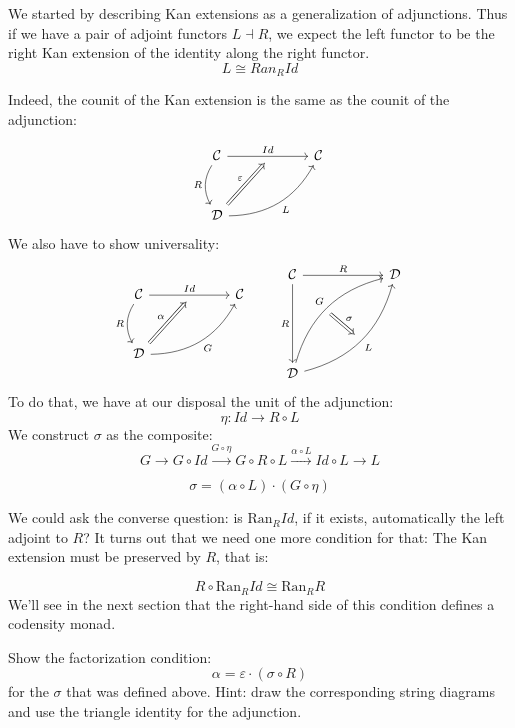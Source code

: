 \documentclass[DaoFP]{subfiles}
\begin{document}
 We started by describing Kan extensions as a generalization of adjunctions. Thus if we have a pair of adjoint functors $L \dashv R$, we expect the left functor to be the right Kan extension of the identity along the right functor.
 \[ L \cong Ran_R Id \]
 
 Indeed, the counit of the Kan extension is the same as the counit of the adjunction:

 \[
 \begin{tikzcd} [row sep=1cm, column sep=1cm]
 \cat C
 \arrow[rr, "Id", "" {name=ID, below} ]
 \arrow[d, bend right, "R"']
 && \cat C
 \\
 \cat D
  \arrow[urr, bend right, "L"']
 \arrow[Rightarrow, "\varepsilon",  to=ID]
 \end{tikzcd}
\]
We also have to show universality:
\[
 \begin{tikzcd} [row sep=1cm, column sep=1cm]
 \cat C
 \arrow[rr, "Id", "" {name=ID, below} ]
 \arrow[d, bend right, "R"']
 && \cat C
 \\
 \cat D
  \arrow[urr, bend right, "G"']
 \arrow[Rightarrow, "\alpha",  to=ID]
 \end{tikzcd}
 \qquad %
\begin{tikzcd}[row sep=2cm, column sep=2cm]
\cat C  \ar[d, "R"', "" {name=P}]
            \ar[r, "R", ""  {name=F, below, near start, bend right}]
&
\cat D
\\
\cat D
    \ar[ur, bend left, "G", "" {name=G, below}]
    \ar[ur, bend right, "L"', "" {name=Ran}]
\arrow[Rightarrow, "\sigma", from=G, to=Ran]
\end{tikzcd}
\]
To do that, we have at our disposal the unit of the adjunction:
\[ \eta \colon Id \to R \circ L \]
We construct $\sigma$ as the composite:
\[ G \rightarrow G \circ Id \xrightarrow{G \circ \eta} G \circ R \circ L \xrightarrow{\alpha \circ L} Id \circ L \rightarrow L\]

\[ \sigma = (\alpha \circ L) \cdot (G \circ \eta) \]

We could ask the converse question: is $\text{Ran}_R Id$, if it exists, automatically the left adjoint to $R$? It turns out that we need one more condition for that: The Kan extension must be preserved by $R$, that is:

\[ R \circ \text{Ran}_R Id \cong \text{Ran}_R R \]
We'll see in the next section that the right-hand side of this condition defines a codensity monad.

\begin{exercise}
Show the factorization condition: 
\[ \alpha = \varepsilon \cdot (\sigma \circ R) \]
for the $\sigma$ that was defined above. Hint: draw the corresponding string diagrams and use the triangle identity for the adjunction.
\end{exercise}
\end{document}
